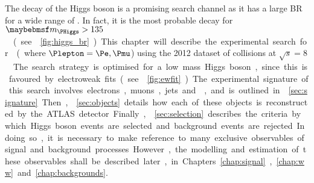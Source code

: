 
The \WW decay of the Higgs boson is a promising search channel as it has a large \ac{BR} 
for a wide range of \mH. In fact, it is the most probable decay for 
\unit{$\mH > 135$}{\GeV} (see \Figure~\ref{fig:higgs_br}). This chapter will describe the 
experimental search for \ggHWWlvlv (where $\Plepton = \Pe, \Pmu$) using the 2012 dataset 
of \pp collisions at \unit{$\sqrt{s} = 8$}{\TeV}. The search strategy is optimised for a 
low mass Higgs boson, since this is favoured by electroweak fits (see 
\Figure~\ref{fig:ewfit}).

The experimental signature of this search involves electrons, muons, jets and \met, and is 
outlined in \Section~\ref{sec:signature}. Then, \Section~\ref{sec:objects} details how 
each of these objects is reconstructed by the ATLAS detector. Finally, 
\Section~\ref{sec:selection} describes the criteria by which Higgs boson events are 
selected and background events are rejected. In doing so, it is necessary to make 
reference to many exclusive observables of signal and background processes. However, 
the modelling and estimation of these observables shall be described later, in 
Chapters~\ref{chap:signal}, \ref{chap:ww} and \ref{chap:backgrounds}.
